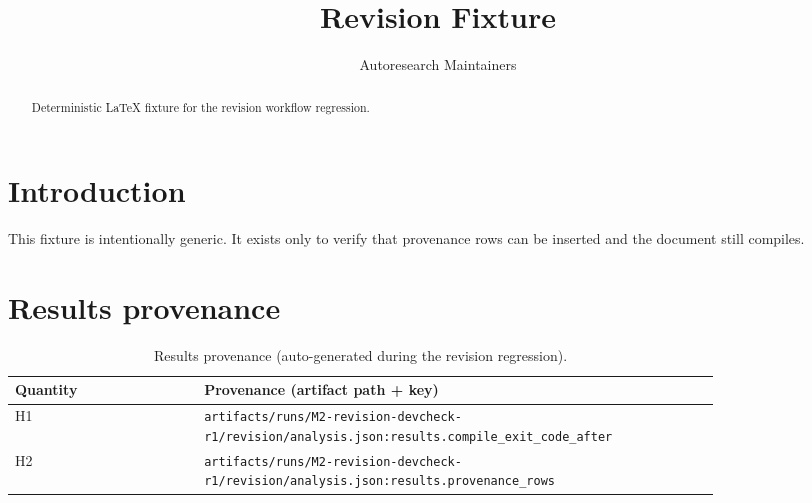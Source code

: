 \documentclass[aps,prd,preprint,12pt]{revtex4-2}
\begin{document}
\title{Revision Fixture}
\author{Autoresearch Maintainers}
\date{}

\begin{abstract}
Deterministic LaTeX fixture for the revision workflow regression.
\end{abstract}

\maketitle

\section{Introduction}
This fixture is intentionally generic. It exists only to verify that provenance rows can be inserted and the document still compiles.

\appendix

\section{Results provenance}
\begin{table}[h]
\centering
\begin{tabular}{p{0.22\linewidth} p{0.60\linewidth}}
\hline
Quantity & Provenance (artifact path + key) \\
\hline
H1 & \texttt{artifacts/runs/M2-revision-devcheck-r1/revision/analysis.json:results.compile\_exit\_code\_after} \\
H2 & \texttt{artifacts/runs/M2-revision-devcheck-r1/revision/analysis.json:results.provenance\_rows} \\
\hline
\end{tabular}
\caption{Results provenance (auto-generated during the revision regression).}
\end{table}



\end{document}
